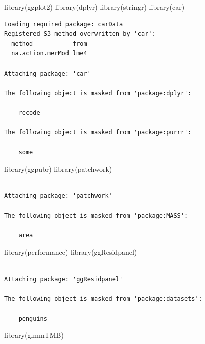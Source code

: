 \documentclass[
  letterpaper,
  DIV=11,
  numbers=noendperiod]{scrartcl}
\newenvironment{Shaded}{\begin{snugshade}}{\end{snugshade}}
\newcommand{\FunctionTok}[1]{\textcolor[rgb]{0.28,0.35,0.67}{#1}}
\newcommand{\NormalTok}[1]{\textcolor[rgb]{0.00,0.23,0.31}{#1}}
\begin{document}
\begin{Shaded}
\begin{Highlighting}[]
\FunctionTok{library}\NormalTok{(ggplot2)}
\FunctionTok{library}\NormalTok{(dplyr)}
\FunctionTok{library}\NormalTok{(stringr)}
\FunctionTok{library}\NormalTok{(car)}
\end{Highlighting}
\end{Shaded}

\begin{verbatim}
Loading required package: carData
Registered S3 method overwritten by 'car':
  method           from
  na.action.merMod lme4

Attaching package: 'car'

The following object is masked from 'package:dplyr':

    recode

The following object is masked from 'package:purrr':

    some
\end{verbatim}

\begin{Shaded}
\begin{Highlighting}[]
\FunctionTok{library}\NormalTok{(ggpubr)}
\FunctionTok{library}\NormalTok{(patchwork)}
\end{Highlighting}
\end{Shaded}

\begin{verbatim}

Attaching package: 'patchwork'

The following object is masked from 'package:MASS':

    area
\end{verbatim}

\begin{Shaded}
\begin{Highlighting}[]
\FunctionTok{library}\NormalTok{(performance)}
\FunctionTok{library}\NormalTok{(ggResidpanel)}
\end{Highlighting}
\end{Shaded}

\begin{verbatim}

Attaching package: 'ggResidpanel'

The following object is masked from 'package:datasets':

    penguins
\end{verbatim}

\begin{Shaded}
\begin{Highlighting}[]
\FunctionTok{library}\NormalTok{(glmmTMB)}
\end{Highlighting}
\end{Shaded}
\end{document}
